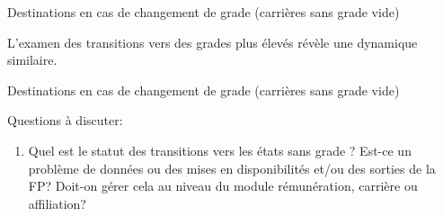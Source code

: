 \documentclass[11pt,a4paper]{article}
\begin{document}
\begin{table}[htbp]
    \label{tab:purged_destination}
    \centering
    \caption{Destinations en cas de changement de grade (carrières sans grade vide)} 
    
\end{table}

L'examen des transitions vers des grades plus élevés révèle une dynamique similaire.
\begin{table}[htbp]
    \label{tab:purged_second_destination}
    \centering
    \caption{Destinations en cas de changement de grade (carrières sans grade vide)} 
    
\end{table}

Questions à discuter:
\begin{enumerate}[leftmargin=1cm, parsep=0cm, itemsep=0cm, topsep=0cm] 
    \item Quel est le statut des transitions vers les états sans grade ? Est-ce un problème de données ou des mises en disponibilités et/ou des sorties de la FP? Doit-on gérer cela au niveau du module rémunération, carrière ou affiliation? 
\end{enumerate}




\ifx\isEmbedded\undefined
\newpage
 

\end{document}
